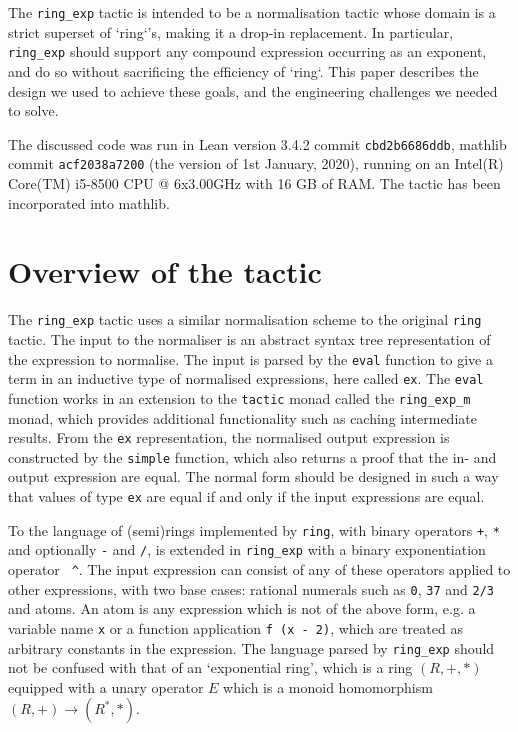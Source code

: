 \documentclass{llncs}
\newcommand{\lean}[1]{\texttt{#1}\xspace} %
\newcommand{\ring}{\lean{ring}}
\newcommand{\ringexp}{\lean{ring\_exp}}
\begin{document}

The \ringexp tactic is intended to be a normalisation tactic whose domain is a strict superset of `ring`'s,
making it a drop-in replacement.
In particular, \ringexp should support any compound expression occurring as an exponent,
and do so without sacrificing the efficiency of `ring`.
This paper describes the design we used to achieve these goals,
and the engineering challenges we needed to solve.

The discussed code was run in Lean version 3.4.2 commit \lean{cbd2b6686ddb}, mathlib commit \texttt{acf2038a7200} (the version of 1st January, 2020), running on an Intel(R) Core(TM) i5-8500 CPU @ 6x3.00GHz with 16 GB of RAM.
The tactic has been incorporated into mathlib.

\section{Overview of the tactic}

The \ringexp tactic uses a similar normalisation scheme to the original \ring tactic.
The input to the normaliser is an abstract syntax tree representation of the expression to normalise.
The input is parsed by the \lean{eval} function to give a term in an inductive type of normalised expressions, here called \lean{ex}.
The \lean{eval} function works in an extension to the \lean{tactic} monad called the \lean{ring\_exp\_m} monad,
which provides additional functionality such as caching intermediate results.
From the \lean{ex} representation, the normalised output expression is constructed by the \lean{simple} function,
which also returns a proof that the in- and output expression are equal.
The normal form should be designed in such a way that values of type \lean{ex} are equal if and only if the input expressions are equal.

To the language of (semi)rings implemented by \ring, with binary operators \lean{+}, \lean{*} and optionally \lean{-} and \lean{/},
is extended in \ringexp with a binary exponentiation operator \lean{\ \^}.
The input expression can consist of any of these operators applied to other expressions,
with two base cases: rational numerals such as \lean{0}, \lean{37} and \lean{2/3} and atoms.
An atom is any expression which is not of the above form, e.g. a variable name \lean{x} or a function application \lean{f (x - 2)},
which are treated as arbitrary constants in the expression.
The language parsed by \ringexp should not be confused with that of an `exponential ring', which is a ring $(R, +, *)$ equipped with a unary operator $E$ which is a monoid homomorphism $(R, +) \to (R^*, *)$.
\end{document}
